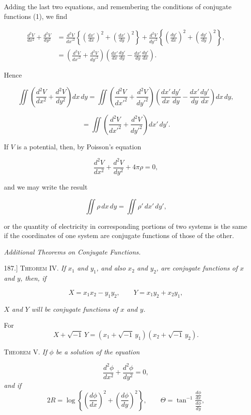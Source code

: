 \documentclass[11pt,a4paper]{article}
\begin{document}
Adding the last two equations, and remembering the conditions of conjugate functions (1), we find

\[
\begin{split}
\frac{d^2V}{dx^2}+\frac{d^2V}{dy^2}
&= \frac{d^2V}{dx'^2}
   \left\{
   \left(\frac{dx'}{dx}\right)^2
   +\left(\frac{dx'}{dy}\right)^2
   \right\}
 + \frac{d^2V}{dy'^2}
   \left\{
   \left(\frac{dy'}{dx}\right)^2
   +\left(\frac{dy'}{dy}\right)^2
   \right\},\\
&= \left(\frac{d^2V}{dx'^2}+\frac{d^2V}{dy'^2}\right)
   \left(
   \frac{dx'}{dx}\frac{dy'}{dy}
   -\frac{dx'}{dy}\frac{dy'}{dx}
   \right).
\end{split}
\]

Hence

\[
\iint\left(\frac{d^2V}{dx^2}+\frac{d^2V}{dy^2}\right)dx\,dy
=
\iint\left(\frac{d^2V}{dx'^2}+\frac{d^2V}{dy'^2}\right)
\left(
\frac{dx'}{dx}\frac{dy'}{dy}
-\frac{dx'}{dy}\frac{dy'}{dx}
\right)dx\,dy,
\]

\[
= \iint\left(\frac{d^2V}{dx'^2}+\frac{d^2V}{dy'^2}\right)dx'\,dy'.
\]

If $V$ is a potential, then, by Poisson's equation

\[
\frac{d^2V}{dx^2}+\frac{d^2V}{dy^2}+4\pi\rho=0,
\]

and we may write the result

\[
\iint \rho\,dx\,dy = \iint \rho'\,dx'\,dy',
\]

or the quantity of electricity in corresponding portions of two systems is the same if the coordinates of one system are conjugate functions of those of the other.

\begin{center}
\textit{Additional Theorems on Conjugate Functions.}
\end{center}

187.] \textsc{Theorem IV.} \textit{If $x_1$ and $y_1$, and also $x_2$ and $y_2$, are conjugate functions of $x$ and $y$, then, if}

\[
X=x_1x_2-y_1y_2,\qquad
Y=x_1y_2+x_2y_1,
\]

\textit{$X$ and $Y$ will be conjugate functions of $x$ and $y$.}

For
\[
X+\sqrt{-1}\,Y
=(x_1+\sqrt{-1}\,y_1)(x_2+\sqrt{-1}\,y_2).
\]

\textsc{Theorem V.} \textit{If $\phi$ be a solution of the equation}

\[
\frac{d^2\phi}{dx^2}+\frac{d^2\phi}{dy^2}=0,
\]
\textit{and if}
\[
2R=\log\left\{
\left(\frac{d\phi}{dx}\right)^2
+\left(\frac{d\phi}{dy}\right)^2
\right\},
\qquad
\Theta=\tan^{-1}
\frac{\frac{d\phi}{dx}}{\frac{d\phi}{dy}},
\]
\end{document}
